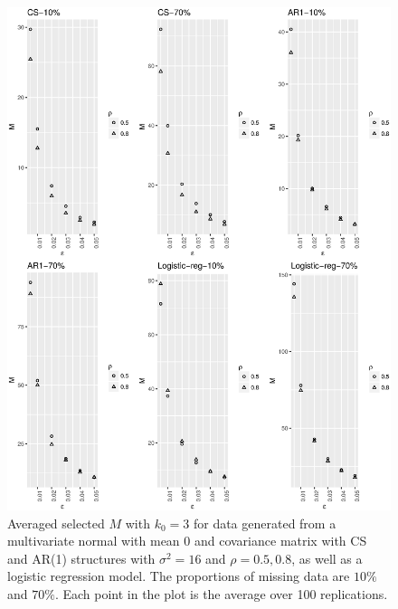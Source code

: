 \documentclass[11pt,a5paper,twoside]{book}
\begin{document}
\begin{figure}
	\centering
	\includegraphics[width=\textwidth]{figMisisngInformation.eps}
	\caption[Averaged selected $M$ with $k_0 = 3$ for data generated from a multivariate normal with mean 0 and covariance matrix with CS and AR(1) structures with  $\sigma^2 =16$ and $\rho = 0.5, 0.8$, as well as a logistic regression model]{Averaged selected $M$ with $k_0 = 3$ for data generated from a multivariate normal with mean 0 and covariance matrix with CS and AR(1) structures with  $\sigma^2 =16$ and $\rho = 0.5, 0.8$, as well as a logistic regression model. The proportions of missing data are $10\%$ and $70\%$. Each point in the plot is the average over 100 replications.}
	\label{fig_missinfo}
\end{figure} 
\end{document}

